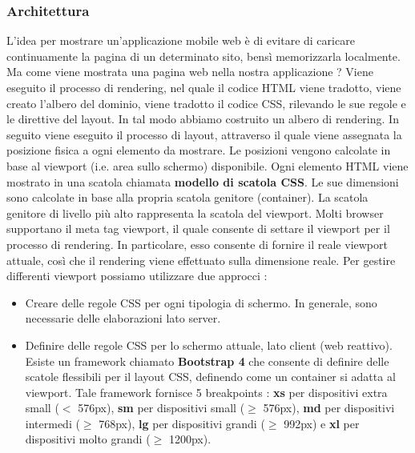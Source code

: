 \documentclass[12pt]{report}
\begin{document}
\subsubsection{Architettura}
L'idea per mostrare un'applicazione mobile web è di evitare di caricare continuamente la pagina di un determinato sito, bensì memorizzarla localmente. Ma come viene mostrata una pagina web nella nostra applicazione ? Viene eseguito il processo di rendering, nel quale il codice HTML viene tradotto, viene creato l'albero del dominio, viene tradotto il codice CSS, rilevando le sue regole e le direttive del layout. In tal modo abbiamo costruito un albero di rendering. In seguito viene eseguito il processo di layout, attraverso il quale viene assegnata la posizione fisica a ogni elemento da mostrare. Le posizioni vengono calcolate in base al viewport (i.e. area sullo schermo) disponibile. Ogni elemento HTML viene mostrato in una scatola chiamata \textbf{modello di scatola CSS}. Le sue dimensioni sono calcolate in base alla propria scatola genitore (container). La scatola genitore di livello più alto rappresenta la scatola del viewport. Molti browser supportano il meta tag viewport, il quale consente di settare il viewport per il processo di rendering. In particolare, esso consente di fornire il reale viewport attuale, così che il rendering viene effettuato sulla dimensione reale. Per gestire differenti viewport possiamo utilizzare due approcci :
\begin{itemize}
\item Creare delle regole CSS per ogni tipologia di schermo. In generale, sono necessarie delle elaborazioni lato server.
\item Definire delle regole CSS per lo schermo attuale, lato client (web reattivo). Esiste un framework chiamato \textbf{Bootstrap 4} che consente di definire delle scatole flessibili per il layout CSS, definendo come un container si adatta al viewport. Tale framework fornisce 5 breakpoints : \textbf{xs} per dispositivi extra small ($<$ 576px), \textbf{sm} per dispositivi small ($\geq$ 576px), \textbf{md} per dispositivi intermedi ($\geq$ 768px), \textbf{lg} per dispositivi grandi ($\geq$ 992px) e \textbf{xl} per dispositivi molto grandi ($\geq$ 1200px).
\end{itemize}
\end{document}
